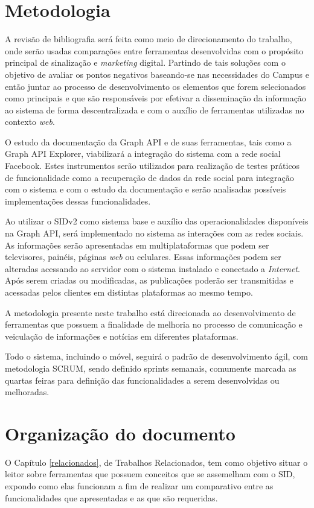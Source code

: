 \section{Metodologia}
A revisão de bibliografia será feita como meio de direcionamento do trabalho, onde serão usadas comparações entre ferramentas desenvolvidas com o propósito principal de sinalização e \textit{marketing} digital. Partindo de tais soluções com o objetivo de avaliar os pontos negativos baseando-se nas necessidades do Campus e então juntar ao processo de desenvolvimento os elementos que forem selecionados como principais e que são responsáveis por efetivar a disseminação da informação ao sistema de forma descentralizada e com o auxílio de ferramentas utilizadas no contexto \textit{web}.

O estudo da documentação da Graph API e de suas ferramentas, tais como a Graph API Explorer, viabilizará a integração do sistema com a rede social Facebook. Estes instrumentos serão utilizados para realização de testes práticos de funcionalidade como a recuperação de dados da rede social para integração com o sistema e com o estudo da documentação e serão analisadas possíveis implementações dessas funcionalidades.
	 
Ao utilizar o SIDv2 como sistema base e auxílio das operacionalidades  disponíveis na Graph API, será implementado no sistema as interações com as redes sociais. As informações serão apresentadas em multiplataformas que podem ser televisores, painéis, páginas \textit{web} ou celulares. Essas informações podem ser alteradas acessando ao servidor com o sistema instalado e conectado a \textit{Internet}. Após serem criadas ou modificadas, as publicações poderão ser transmitidas e acessadas pelos clientes em distintas plataformas ao mesmo tempo.

A metodologia presente neste trabalho está direcionada ao desenvolvimento de ferramentas que possuem a finalidade de melhoria no processo de comunicação e veiculação de informações e notícias em diferentes plataformas. 

Todo o sistema, incluindo o móvel, seguirá o padrão de desenvolvimento ágil, com metodologia SCRUM, sendo definido sprints semanais, comumente marcada as quartas feiras para definição das funcionalidades a serem desenvolvidas ou melhoradas. 

\section{Organização do documento}
O Capítulo \ref{relacionados}, de Trabalhos Relacionados, tem como objetivo situar o leitor sobre ferramentas que possuem conceitos que se assemelham com o SID, expondo como elas funcionam a fim de realizar um comparativo entre as funcionalidades que apresentadas e as que são requeridas.

